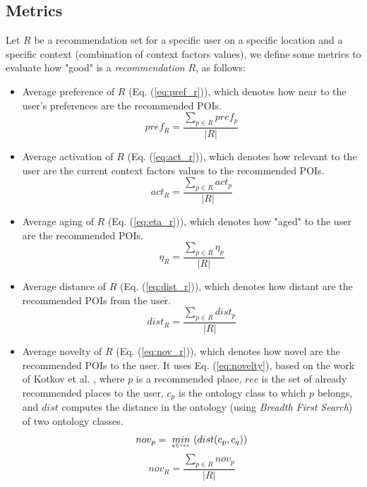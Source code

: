 \subsection{Metrics} \label{section:metrics}

Let $R$ be a recommendation set for a specific user on a specific location and a specific context (combination of context factors values), we define some metrics to evaluate how "good" is a \textit{recommendation} $R$, as follows:

\begin{itemize}
    \item Average preference of $R$ (Eq. (\ref{eq:pref_r})), which denotes how near to the user's preferences are the recommended POIs.
    \begin{equation} \label{eq:pref_r}
        pref_{R} = \frac{ \displaystyle \sum_{p \in R}{pref_p} }{| R |}
    \end{equation}

    \item Average activation of $R$ (Eq. (\ref{eq:act_r})), which denotes how relevant to the user are the current context factors values to the recommended POIs.
    \begin{equation} \label{eq:act_r}
        act_{R} = \frac{ \displaystyle \sum_{p \in R}{act_p} }{| R |}
    \end{equation}

    \item Average aging of $R$ (Eq. (\ref{eq:eta_r})), which denotes how "aged" to the user are the recommended POIs.
    \begin{equation} \label{eq:eta_r}
        \eta_{R} = \frac{ \displaystyle \sum_{p \in R}{\eta_p} }{| R |}
    \end{equation}

    \item Average distance of $R$ (Eq. (\ref{eq:dist_r})), which denotes how distant are the recommended POIs from the user.
    \begin{equation} \label{eq:dist_r}
        dist_{R} = \frac{ \displaystyle \sum_{p \in R}{dist_{p}} }{| R |}
    \end{equation}

    \item Average novelty of $R$ (Eq. (\ref{eq:nov_r})), which denotes how novel are the recommended POIs to the user. It uses Eq. (\ref{eq:novelty}), based on the work of Kotkov et al. \cite{kotkov2016survey}, where $p$ is a recommended place, $rec$ is the set of already recommended places to the user, $c_p$ is the ontology class to which $p$ belongs, and $dist$ computes the distance in the ontology (using \textit{Breadth First Search}) of two ontology classes.
    \begin{equation} \label{eq:novelty}
        nov_{p} = \  \underaccent{q \in rec}{min} \  ( dist( c_p, c_q ) )
    \end{equation}
    \begin{equation} \label{eq:nov_r}
        nov_{R} = \frac{ \displaystyle \sum_{p \in R}{nov_{p}} }{| R |}
    \end{equation}
\end{itemize}

